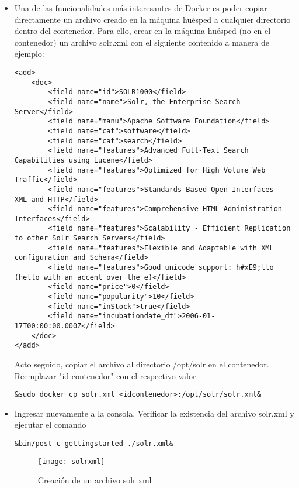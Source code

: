 \documentclass[10pt]{article}   			%
\begin{document}
\begin{itemize}
\item Una de las funcionalidades más interesantes de Docker es poder copiar directamente un archivo creado en la máquina huésped a cualquier directorio dentro del contenedor. Para ello, crear en la máquina huésped (no en el contenedor) un archivo solr.xml con el siguiente contenido a manera de ejemplo:
\begin{small}
\begin{lstlisting}[frame=single,style=base]	
<add>
	<doc>
		<field name="id">SOLR1000</field>
		<field name="name">Solr, the Enterprise Search Server</field>
		<field name="manu">Apache Software Foundation</field>
		<field name="cat">software</field>
		<field name="cat">search</field>
		<field name="features">Advanced Full-Text Search Capabilities using Lucene</field>
		<field name="features">Optimized for High Volume Web Traffic</field>
		<field name="features">Standards Based Open Interfaces - XML and HTTP</field>
		<field name="features">Comprehensive HTML Administration Interfaces</field>
		<field name="features">Scalability - Efficient Replication to other Solr Search Servers</field>
		<field name="features">Flexible and Adaptable with XML configuration and Schema</field>
		<field name="features">Good unicode support: h#xE9;llo (hello with an accent over the e)</field>
		<field name="price">0</field>
		<field name="popularity">10</field>
		<field name="inStock">true</field>
		<field name="incubationdate_dt">2006-01-17T00:00:00.000Z</field>
	</doc>
</add>
\end{lstlisting}
\end{small}

Acto seguido, copiar el archivo al directorio /opt/solr en el contenedor. Reemplazar "id-contenedor" con el respectivo valor.

\begin{small}
\begin{lstlisting}[frame=single,style=base]	
	&sudo docker cp solr.xml <idcontenedor>:/opt/solr/solr.xml&
\end{lstlisting}
\end{small}

\item Ingresar nuevamente a la consola. Verificar la existencia del archivo solr.xml y ejecutar el comando
\begin{small}
\begin{lstlisting}[frame=single,style=base]	
	&bin/post c gettingstarted ./solr.xml&
\end{lstlisting}
\end{small}
\begin{figure}[ht] 
	\centering
		\texttt{[image: solrxml]}   
	\caption{Creación de un archivo solr.xml} \label{fig:solrxml}
\end{figure}


\end{itemize}
\end{document}
